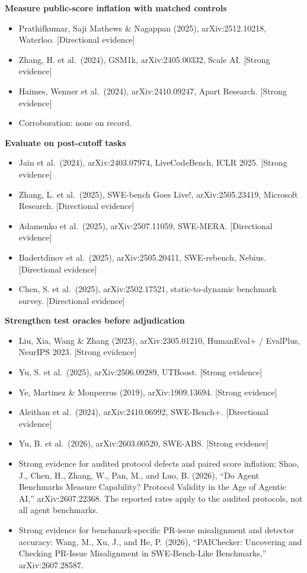 \textbf{Measure public-score inflation with matched controls}

\begin{itemize}
\tightlist
\item
  Prathifkumar, Saji Mathews \& Nagappan (2025), arXiv:2512.10218, Waterloo. {[}Directional evidence{]}
\item
  Zhang, H. et al.~(2024), GSM1k, arXiv:2405.00332, Scale AI. {[}Strong evidence{]}
\item
  Haimes, Wenner et al.~(2024), arXiv:2410.09247, Apart Research. {[}Strong evidence{]}
\item
  Corroboration: none on record.
\end{itemize}

\textbf{Evaluate on post-cutoff tasks}

\begin{itemize}
\tightlist
\item
  Jain et al.~(2024), arXiv:2403.07974, LiveCodeBench, ICLR 2025. {[}Strong evidence{]}
\item
  Zhang, L. et al.~(2025), SWE-bench Goes Live!, arXiv:2505.23419, Microsoft Research. {[}Directional evidence{]}
\item
  Adamenko et al.~(2025), arXiv:2507.11059, SWE-MERA. {[}Directional evidence{]}
\item
  Badertdinov et al.~(2025), arXiv:2505.20411, SWE-rebench, Nebius. {[}Directional evidence{]}
\item
  Chen, S. et al.~(2025), arXiv:2502.17521, static-to-dynamic benchmark survey. {[}Directional evidence{]}
\end{itemize}

\textbf{Strengthen test oracles before adjudication}

\begin{itemize}
\tightlist
\item
  Liu, Xia, Wang \& Zhang (2023), arXiv:2305.01210, HumanEval+ / EvalPlus, NeurIPS 2023. {[}Strong evidence{]}
\item
  Yu, S. et al.~(2025), arXiv:2506.09289, UTBoost. {[}Strong evidence{]}
\item
  Ye, Martinez \& Monperrus (2019), arXiv:1909.13694. {[}Strong evidence{]}
\item
  Aleithan et al.~(2024), arXiv:2410.06992, SWE-Bench+. {[}Directional evidence{]}
\item
  Yu, B. et al.~(2026), arXiv:2603.00520, SWE-ABS. {[}Strong evidence{]}
\item
  Strong evidence for audited protocol defects and paired score inflation: Shao, J., Chen, H., Zhang, W., Pan, M., and Luo, B. (2026), ``Do Agent Benchmarks Measure Capability? Protocol Validity in the Age of Agentic AI,'' arXiv:2607.22368. The reported rates apply to the audited protocols, not all agent benchmarks.
\item
  Strong evidence for benchmark-specific PR-issue misalignment and detector accuracy: Wang, M., Xu, J., and He, P. (2026), ``PAIChecker: Uncovering and Checking PR-Issue Misalignment in SWE-Bench-Like Benchmarks,'' arXiv:2607.28587.
\end{itemize}

